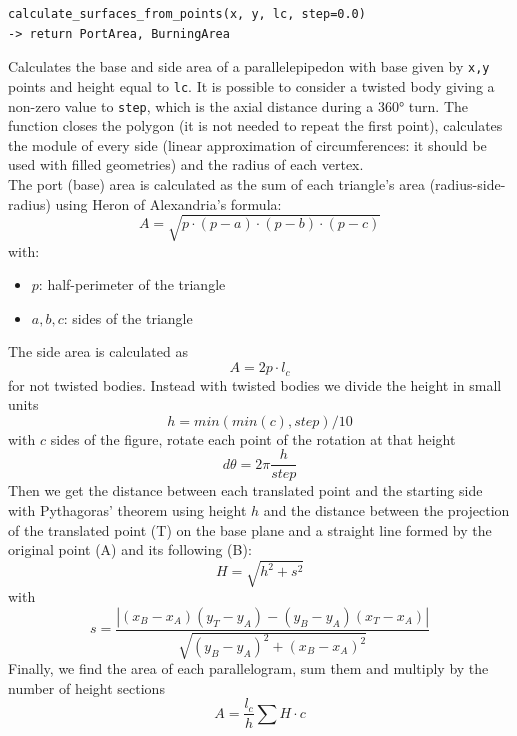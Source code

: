 \begin{verbatim}
calculate_surfaces_from_points(x, y, lc, step=0.0)
-> return PortArea, BurningArea
\end{verbatim}
\hspace*{2em} Calculates the base and side area of a parallelepipedon with base given by \verb|x,y| points and height equal to \verb|lc|. It is possible to consider a twisted body giving a non-zero value to \verb|step|, which is the axial distance during a $360°$ turn. The function closes the polygon (it is not needed to repeat the first point), calculates the module of every side (linear approximation of circumferences: it should be used with filled geometries) and the radius of each vertex.\\ 
The port (base) area is calculated as the sum of each triangle's area (radius-side-radius) using Heron of Alexandria's formula:
\begin{equation}
    A = \sqrt{p\cdot(p-a)\cdot(p-b)\cdot(p-c)}
\end{equation}
with:
\begin{itemize}
    \item $p$: half-perimeter of the triangle
    \item $a, b, c$: sides of the triangle
\end{itemize}
\hspace*{2em} The side area is calculated as
\begin{equation}
    A=2p \cdot l_c
\end{equation}
for not twisted bodies. Instead with twisted bodies we divide the height in small units
\begin{equation}
    h=min(min(c), step) / 10
\end{equation}
with $c$ sides of the figure, rotate each point of the rotation at that height
\begin{equation}
    d\theta=2\pi\frac{h}{step}
\end{equation}
Then we get the distance between each translated point and the starting side with Pythagoras' theorem using height $h$ and the distance between the projection of the translated point (T) on the base plane and a straight line formed by the original point (A) and its following (B):
\begin{equation}
    H=\sqrt{h^2 + s^2}
\end{equation}
with
\begin{equation*}
    s = \frac{|(x_B-x_A)(y_T-y_A) - (y_B-y_A)(x_T-x_A)|}{\sqrt{(y_B-y_A)^2 + (x_B-x_A)^2}}
\end{equation*}
Finally, we find the area of each parallelogram, sum them and multiply by the number of height sections
\begin{equation}
    A=\frac{l_c}{h} \sum{H\cdot c}
\end{equation}

